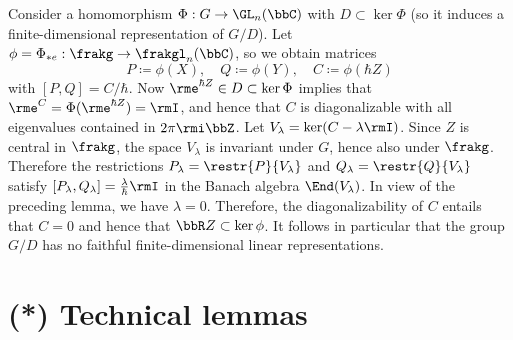 \begin{example}
    Consider a homomorphism $\Phi:G\to\GL_n(\bbC)$ with $D\subset \ker\Phi$ (so it induces a finite-dimensional representation of $G\slash D$). Let $\phi=\Phi_{\ast e}:\frakg\to \frakgl_n(\bbC)$, so we obtain matrices
    \[P\coloneqq \phi(X), \quad Q\coloneqq \phi(Y),\quad C\coloneqq \phi(\hbar Z)\]
    with $[P,Q]=C/\hbar$. Now $\rme^{\hbar Z}\in D\subset\ker\Phi$ implies that $\rme^{C}=\Phi(\rme^{\hbar Z})=\rmI$, and hence that $C$ is diagonalizable with all eigenvalues contained in $2\pi\rmi\bbZ$. Let $V_\lambda=\ker (C-\lambda \rmI)$. Since $Z$ is central in $\frakg$, the space $V_\lambda$ is invariant under $G$, hence also under $\frakg$. Therefore the restrictions $P_\lambda=\restr{P}{V_\lambda}$ and $Q_\lambda=\restr{Q}{V_\lambda}$ satisfy $[P_\lambda,Q_\lambda]=\frac{\lambda}{\hbar} \rmI$ in the Banach algebra $\End(V_\lambda)$. In view of the preceding lemma, we have $\lambda=0$. Therefore, the diagonalizability of $C$ entails that $C=0$ and hence that $\bbR Z\subset \ker\phi$. It follows in particular that the group $G\slash D$ has no faithful finite-dimensional linear representations.
\end{example}









\section{(*) Technical lemmas}


